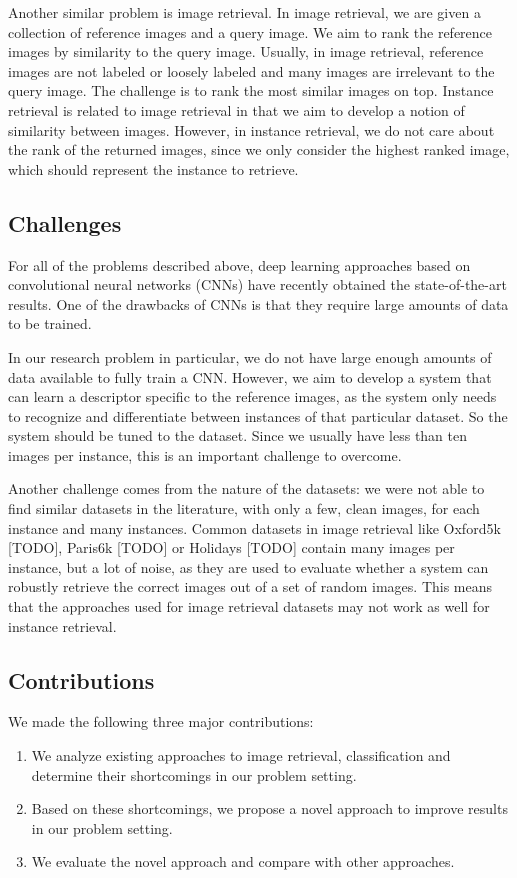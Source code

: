 \documentclass[fleqn]{article}
\begin{document}
Another similar problem is image retrieval. In image retrieval,
we are given a collection of reference images and a query image.
We aim to rank the reference images by similarity to the query image.
Usually, in image retrieval, reference images are not labeled or loosely
labeled and many images are irrelevant to the query image. The challenge
is to rank the most similar images on top.
Instance retrieval is related to image retrieval in that we aim to
develop a notion of similarity between images. However, in instance
retrieval, we do not care about the rank of the returned images, since
we only consider the highest ranked image, which should represent the
instance to retrieve.


\subsection{Challenges}
For all of the problems described above, deep learning approaches
based on convolutional neural networks (CNNs) have recently obtained
the state-of-the-art results. One of the drawbacks of CNNs is that
they require large amounts of data to be trained.

In our research problem in particular, we do not
have large enough amounts of data available to fully train a CNN.
However, we aim to develop a system that can learn a descriptor
specific to the reference images,
as the system only needs to recognize and differentiate between
instances of that particular dataset. So the system should be tuned to
the dataset. Since we usually have less than ten images per instance,
this is an important challenge to overcome.

Another challenge comes from the nature of the datasets: we were not
able to find similar datasets in the literature, with only a few,
clean images, for each instance and many instances.
Common datasets in image retrieval like Oxford5k [TODO], Paris6k [TODO]
or Holidays [TODO] contain many images per instance, but a lot of noise,
as they are used to evaluate whether a system can robustly retrieve the
correct images out of a set of random images.
This means that the approaches used for image retrieval datasets may
not work as well for instance retrieval.

\subsection{Contributions}
We made the following three major contributions:
\begin{enumerate}
    \item We analyze existing approaches to image retrieval, classification
    and determine their shortcomings in our problem setting.
    \item Based on these shortcomings, we propose a novel approach
    to improve results in our problem setting.
    \item We evaluate the novel approach and compare with other approaches.
\end{enumerate}
\end{document}
